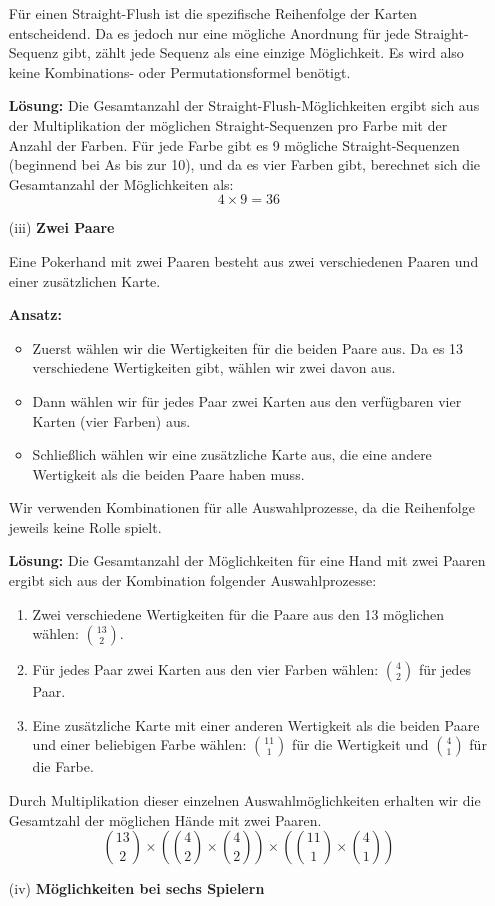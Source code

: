 \documentclass{article}
\begin{document}
\begin{enumerate}
		Für einen Straight-Flush ist die spezifische Reihenfolge der Karten entscheidend. Da es jedoch nur eine mögliche Anordnung für jede Straight-Sequenz gibt, zählt jede Sequenz als eine einzige Möglichkeit. Es wird also keine Kombinations- oder Permutationsformel benötigt.

		\textbf{Lösung:}
		Die Gesamtanzahl der Straight-Flush-Möglichkeiten ergibt sich aus der Multiplikation der möglichen Straight-Sequenzen pro Farbe mit der Anzahl der Farben. Für jede Farbe gibt es 9 mögliche Straight-Sequenzen (beginnend bei As bis zur 10), und da es vier Farben gibt, berechnet sich die Gesamtanzahl der Möglichkeiten als:
		\[
			4 \times 9 = 36
		\]
	\item[(iii)] \textbf{Zwei Paare}

		Eine Pokerhand mit zwei Paaren besteht aus zwei verschiedenen Paaren und einer zusätzlichen Karte.

		\textbf{Ansatz:}
		\begin{itemize}
			\item Zuerst wählen wir die Wertigkeiten für die beiden Paare aus. Da es 13 verschiedene Wertigkeiten gibt, wählen wir zwei davon aus.
			\item Dann wählen wir für jedes Paar zwei Karten aus den verfügbaren vier Karten (vier Farben) aus.
			\item Schließlich wählen wir eine zusätzliche Karte aus, die eine andere Wertigkeit als die beiden Paare haben muss.
		\end{itemize}
		Wir verwenden Kombinationen für alle Auswahlprozesse, da die Reihenfolge jeweils keine Rolle spielt.

		\textbf{Lösung:}
		Die Gesamtanzahl der Möglichkeiten für eine Hand mit zwei Paaren ergibt sich aus der Kombination folgender Auswahlprozesse:
		\begin{enumerate}
			\item Zwei verschiedene Wertigkeiten für die Paare aus den 13 möglichen wählen: \( \binom{13}{2} \).
			\item Für jedes Paar zwei Karten aus den vier Farben wählen: \( \binom{4}{2} \) für jedes Paar.
			\item Eine zusätzliche Karte mit einer anderen Wertigkeit als die beiden Paare und einer beliebigen Farbe wählen: \( \binom{11}{1} \) für die Wertigkeit und \( \binom{4}{1} \) für die Farbe.
		\end{enumerate}
		Durch Multiplikation dieser einzelnen Auswahlmöglichkeiten erhalten wir die Gesamtzahl der möglichen Hände mit zwei Paaren.
		\[
			\binom{13}{2} \times \left( \binom{4}{2} \times \binom{4}{2} \right) \times \left( \binom{11}{1} \times \binom{4}{1} \right)
		\]
	\item[(iv)] \textbf{Möglichkeiten bei sechs Spielern}


\end{enumerate}
\end{document}
